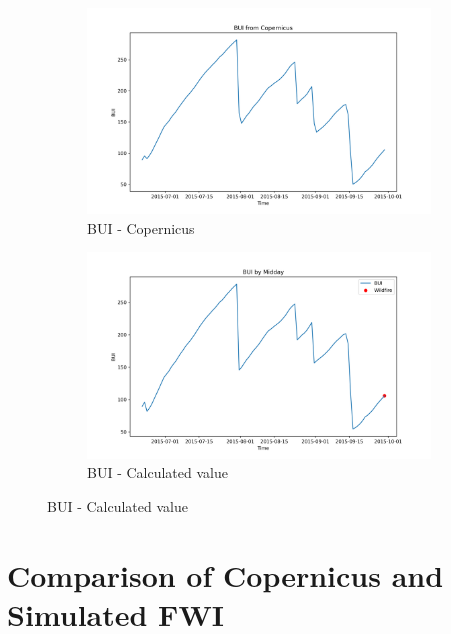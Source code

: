 \begin{figure}[h]
\caption{Comparison of BUI calculated values and Copernicus}
    \centering
    \begin{subfigure}{0.49\textwidth}
        \centering
        \includegraphics[width=\textwidth]{graphs/2015MesmoSitio/2015CopernicusBUI12.png}
        \caption{BUI - Copernicus}
        \label{fig:bui_copernicus_2015_semfogo}
    \end{subfigure}
    \hfill
    \begin{subfigure}{0.49\textwidth}
        \centering
        \includegraphics[width=\textwidth]{graphs/2015MesmoSitio/2015CalcBUI12.png}
        \caption{BUI - Calculated value}
        \label{fig:bui_calculated_2015_semfogo}
    \end{subfigure}
    \label{fig:comparison_bui_semfogo_copernicus_calculated}
\end{figure}

\FloatBarrier

\section{Comparison of Copernicus and Simulated FWI}

